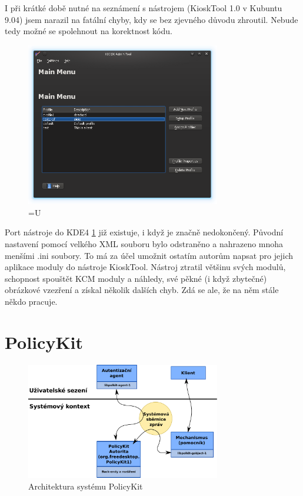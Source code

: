 I při krátké době nutné na seznámení s nástrojem (KioskTool 1.0 v Kubuntu 9.04)
jsem narazil na fatální chyby, kdy se bez zjevného důvodu zhroutil. Nebude tedy
možné se spolehnout na korektnost kódu.

\begin{figure}[h]
    \centering
    \includegraphics[width=8.5cm]{obrazky/KioskToolKDE4/kiosktool_kde4.png}
    \caption{=U}
    \label{fig:kt4_uvod}
\end{figure}

Port nástroje do KDE4 \ref{fig:kt4_uvod} již existuje, i když je značně
nedokončený.  %
Původní nastavení pomocí velkého XML souboru bylo odstraněno a nahrazeno mnoha
menšími .ini soubory. To má za účel umožnit ostatím autorům napsat pro jejich
aplikace moduly do nástroje KioskTool. Nástroj ztratil většinu svých modulů,
schopnost spouštět KCM moduly a náhledy, své pěkné (i když zbytečné) obrázkové
vzezření a získal několik dalších chyb. Zdá se ale, že na něm stále někdo
pracuje. %

\section{PolicyKit}
\begin{figure}[h]
    \centering
    \includegraphics[width=8.5cm]{obrazky/polkit-architecture-vector-cz.pdf}
    \caption{Architektura systému PolicyKit}
    \label{fig:polkit_arch}
\end{figure}

